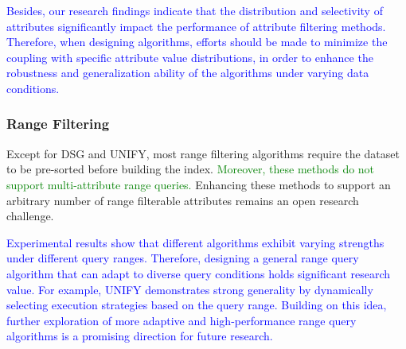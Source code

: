 \documentclass[sigconf, nonacm]{acmart}
\begin{document}
	\textcolor{blue}{
	Besides, our research findings indicate that the distribution and selectivity of attributes significantly impact the performance of attribute filtering methods. Therefore, when designing algorithms, efforts should be made to minimize the coupling with specific attribute value distributions, in order to enhance the robustness and generalization ability of the algorithms under varying data conditions.}
	
	
	\subsubsection{\textbf{Range Filtering}}
	
	Except for DSG and UNIFY, most range filtering algorithms require the dataset to be pre-sorted before building the index. \textcolor{green}{Moreover, these methods do not support multi-attribute range queries. }Enhancing these methods to support an arbitrary number of range filterable attributes remains an open research challenge.
	

\textcolor{blue}{
Experimental results show that different algorithms exhibit varying strengths under different query ranges. Therefore, designing a general range query algorithm that can adapt to diverse query conditions holds significant research value. For example, UNIFY demonstrates strong generality by dynamically selecting execution strategies based on the query range. Building on this idea, further exploration of more adaptive and high-performance range query algorithms is a promising direction for future research.}
	
\end{document}

